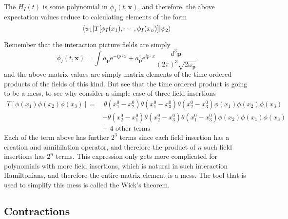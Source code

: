\documentclass[11pt, notitlepage]{report}
\newcommand{\e}{\mathrm{e}}
\newcommand{\w}{\omega}
\renewcommand{\a}[1]{a_\mathbf{#1}}
\newcommand{\adag}[1]{a^\dagger_\mathbf{#1}}
\numberwithin{equation}{section}
\begin{document}
    The \(H_I(t)\) is some polynomial in \(\phi_I(t, \textbf{x})\), and therefore, the above expectation values reduce to calculating elements of the form 
    \begin{equation*}
        \braket{\psi_1 | T[\phi_I(x_1),\cdots,\phi_I(x_n)]|\psi_2}
    \end{equation*}

    Remember that the interaction picture fields are simply
    \begin{equation*}
        \phi_I(t,\textbf{x}) = \int \a{p}\e^{-ip\cdot x} + \adag{p}\e^{ip\cdot x} \frac{d^3\textbf{p}}{(2\pi)^3 \sqrt{2\w_\textbf{p}}}
    \end{equation*}
    and the above matrix values are simply matrix elements of the time ordered products of the fields of this kind. But see that the time ordered product is going to be a mess, to see why consider a simple case of three field insertions 
    \begin{align*}
        T[\phi(x_1)\phi(x_2)\phi(x_3)] =& ~\theta(x_1^0 - x_2^0)\theta(x_1^0 - x_3^0)\theta(x_2^0 - x_3^0) \phi(x_1)\phi(x_2)\phi(x_3) \\
        &+  \theta(x_2^0 - x_1^0)\theta(x_2^0 - x_3^0)\theta(x_1^0 - x_3^0) \phi(x_2)\phi(x_1)\phi(x_3) \\
        &+ \text{ 4 other terms}
    \end{align*}
    Each of the term above has further \(2^3\) terms since each field insertion has a creation and annihilation operator, and therefore the product of \(n\) such field insertions has \(2^n\) terms. This expression only gets more complicated for polynomials with more field insertions, which is natural in such interaction Hamiltonians, and therefore the entire matrix element is a mess. The tool that is used to simplify this mess is called the Wick's theorem.

    \subsection{Contractions}
\end{document}
